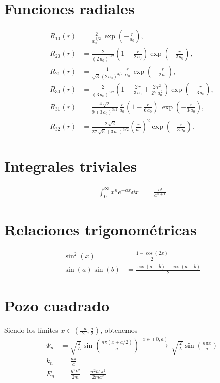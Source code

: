 
\section*{Funciones radiales}
 \begin{align*}
R_{10}(r)&= \frac{2}{a_0^{\,3/2}}\,\exp\left(-\frac{r}{a_0}\right),\\[0.5ex]
R_{20}(r) &= \frac{2}{(2\,a_0)^{3/2}}\left(1-\frac{r}{2\,a_0}\right)
\exp\left(-\frac{r}{2\,a_0}\right),\\[0.5ex]
R_{21}(r)&= \frac{1}{\sqrt{3}\,(2\,a_0)^{3/2}}\,\frac{r}{a_0}\,
\exp\left(-\frac{r}{2\,a_0}\right),\\[0.5ex]
R_{30}(r)&= \frac{2}{(3\,a_0)^{3/2}}\left(1-
\frac{2\,r}{3\,a_0} + \frac{2\,r^2}{27\,a_0^{\,2}}\right)\exp\left(-\frac{r}{3\,a_0}\right),\\[0.5ex]
R_{31}(r) &= \frac{4\,\sqrt{2}}{9\,(3\,a_0)^{3/2}}\,\frac{r}{a_0}
\left(1-\frac{r}{6\,a_0}\right)\,\exp\left(-\frac{r}{3\,a_0}\right),\\[0.5ex]
R_{32}(r)&= \frac{2\,\sqrt{2}}{27\,\sqrt{5}\,(3\,a_0)^{3/2}}
\left(\frac{r}{a_0}\right)^2 \exp\left(-\frac{r}{3\,a_0}\right).
\end{align*}

\section*{Integrales triviales}
\begin{align*}
  \int_0^\infty x^n e^{-ax} \dd{x} &= \frac{n!}{a^{n+1}}
\end{align*}

\section*{Relaciones trigonométricas}
\begin{align*}
  \sin^2(x) &= \frac{ 1 - \cos(2x) }{2}  \\
  \sin(a)\sin(b) &= \frac{\cos(a-b)-\cos(a+b)}{2}
\end{align*}

\section*{Pozo cuadrado}
Siendo los límites $x\in(\frac{-a}{2},\frac{a}{2})$, obtenemos
\begin{align*}
\Psi_n &= \sqrt{\frac{2}{L}}\sin \left( \frac{n\pi(x+a/2)}{a} \right) \ \stackrel{x\in(0,a)}{\rightarrow} \ \sqrt{\frac{2}{L}}\sin \left( \frac{n\pi x}{a} \right) \\
  k_n &= \frac{n\pi}{a} \\
  E_n &= \frac{\hbar^2k^2}{2m} = \frac{n^2 \hbar^2\pi^2}{2ma^2}
\end{align*}

